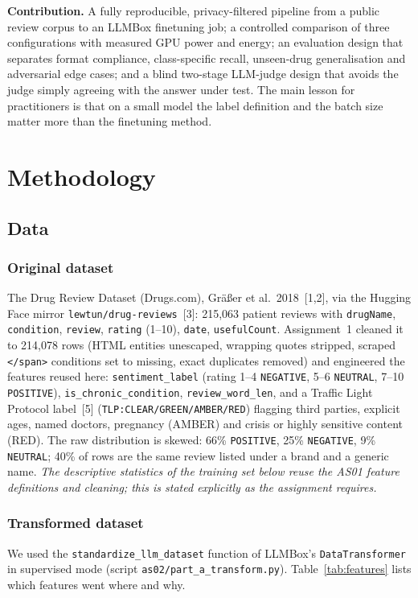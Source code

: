 \documentclass[11pt]{article}
\newcommand{\code}[1]{\texttt{#1}}
\begin{document}
\textbf{Contribution.} A fully reproducible, privacy-filtered pipeline from a public review corpus to an LLMBox finetuning job; a controlled comparison of three configurations with measured GPU power and energy; an evaluation design that separates format compliance, class-specific recall, unseen-drug generalisation and adversarial edge cases; and a blind two-stage LLM-judge design that avoids the judge simply agreeing with the answer under test. The main lesson for practitioners is that on a small model the label definition and the batch size matter more than the finetuning method.

\section{Methodology}
\subsection{Data}
\subsubsection{Original dataset}
The Drug Review Dataset (Drugs.com), Gr\"a{\ss}er et al.\ 2018~[1,2], via the Hugging Face mirror \code{lewtun/drug-reviews}~[3]: 215,063 patient reviews with \code{drugName}, \code{condition}, \code{review}, \code{rating} (1--10), \code{date}, \code{usefulCount}. Assignment~1 cleaned it to 214,078 rows (HTML entities unescaped, wrapping quotes stripped, scraped \code{</span>} conditions set to missing, exact duplicates removed) and engineered the features reused here: \code{sentiment\_label} (rating 1--4 \code{NEGATIVE}, 5--6 \code{NEUTRAL}, 7--10 \code{POSITIVE}), \code{is\_chronic\_condition}, \code{review\_word\_len}, and a Traffic Light Protocol label~[5] (\code{TLP:CLEAR/GREEN/AMBER/RED}) flagging third parties, explicit ages, named doctors, pregnancy (AMBER) and crisis or highly sensitive content (RED). The raw distribution is skewed: 66\% \code{POSITIVE}, 25\% \code{NEGATIVE}, 9\% \code{NEUTRAL}; 40\% of rows are the same review listed under a brand and a generic name. \emph{The descriptive statistics of the training set below reuse the AS01 feature definitions and cleaning; this is stated explicitly as the assignment requires.}

\subsubsection{Transformed dataset}
We used the \code{standardize\_llm\_dataset} function of LLMBox's \code{DataTransformer} in supervised mode (script \code{as02/part\_a\_transform.py}). Table~\ref{tab:features} lists which features went where and why.
\end{document}
